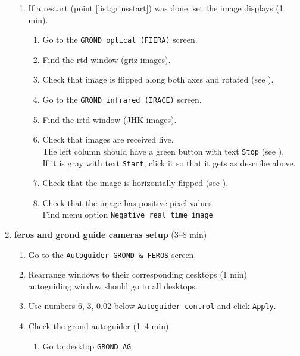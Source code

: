 \documentclass[11pt,fleqn,a4paper]{book}
\begin{document}
\begin{enumerate}
\begin{enumerate}
         \item If a restart (point \ref{list:grinsstart}) was done, set the image displays (1 min).
            \begin{enumerate}
               \item Go to the \texttt{GROND optical (FIERA)} screen.
               \item Find the \gls{rtd} window (griz images).
               \item Check that image is flipped along both axes and rotated (see ).
               \item Go to the \texttt{GROND infrared (IRACE)} screen.
               \item Find the \gls{irtd} window (JHK images).               
               \item Check that images are received live.\\
                     The left column should have a green button with text \texttt{Stop} (see ).\\
                     If it is gray with text \texttt{Start}, click it so that it gets as describe above.
              \item Check that the image is horizontally flipped (see ).
              \item Check that the image has positive pixel values\\
                    Find menu option \texttt{Negative real time image}
             \end{enumerate}
        \end{enumerate}
  \item \textbf{\gls{feros} and \gls{grond} guide cameras setup} (3--8 min)\label{list:ag}
        \begin{enumerate}
           \item Go to the \texttt{Autoguider GROND \& FEROS} screen. 
           \item Rearrange windows to their corresponding \gls{desktop}s (1 min)\\
                 \gls{autoguiding} window should go to all \gls{desktop}s.
           \item Use numbers 6, 3, 0.02 below \texttt{Autoguider control} and click \texttt{Apply}.
           \item Check the \gls{grond} autoguider (1--4 min)
               \begin{enumerate}
                  \item Go to \gls{desktop} \texttt{GROND AG}

\end{enumerate}
\end{enumerate}
\end{enumerate}
\end{document}
